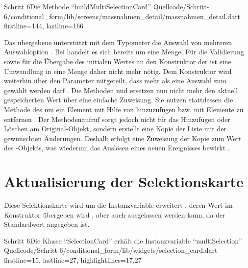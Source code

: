 \begin{alexlisting}{Schritt 6}{Die Methode \enquote{buildMultiSelectionCard}}
  {Quellcode/Schritt-6/conditional_form/lib/screens/massnahmen_detail/massnahmen_detail.dart}
  {firstline=144, lastline=166}
  \label{lst:Schritt6buildMultiSelectionCard}
\end{alexlisting}

Das übergebene  unterstützt mit dem Typometer  die Auswahl von mehreren Auswahloption .
Bei  handelt es sich bereits um eine Menge.
Für die Validierung  sowie für die Übergabe des initialen Wertes an den Konstruktor der   ist eine Umwandlung in eine Menge daher nicht mehr nötig.
Dem Konstruktor  wird weiterhin über den Parameter  mitgeteilt, dass mehr als eine Auswahl zum gewählt werden darf .
Die Methoden  und  ersetzen nun nicht mehr den aktuell gespeicherten Wert über eine einfache Zuweisung.
Sie nutzen stattdessen die Methode  des  um ein Element mit Hilfe von  hinzuzufügen  bzw. mit  Elemente zu entfernen .
Der Methodenaufruf  sorgt jedoch nicht für das Hinzufügen oder Löschen am Original-Objekt, sondern erstellt eine Kopie der Liste mit der gewünschten Änderungen.
Deshalb erfolgt eine Zuweisung der Kopie zum Wert des -Objekts, was wiederum das Auslösen eines neuen Ereignisses bewirkt .

\section{Aktualisierung der Selektionskarte}


Diese Selektionskarte wird um die Instanzvariable  erweitert ,
deren Wert im Konstruktor übergeben wird , aber auch ausgelassen werden kann, da der Standardwert  angegeben ist.

\begin{alexlisting}{Schritt 6}{Die Klasse \enquote{SelectionCard} erhält die Instanzvariable \enquote{multiSelection}}
  {Quellcode/Schritt-6/conditional_form/lib/widgets/selection_card.dart}
  {firstline=15, lastline=27, highlightlines={17,27}}
  \label{lst:Schritt6SelectionCard}
\end{alexlisting}


